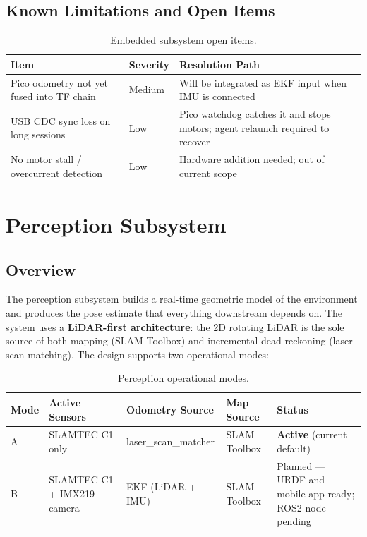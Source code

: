 \documentclass[12pt,a4paper]{report}
\begin{document}
\section{Known Limitations and Open Items}

\begin{table}[H]
\centering
\caption{Embedded subsystem open items.}
\label{tab:pico_limits}
\begin{tabularx}{\textwidth}{|p{3.8cm}|p{1.4cm}|X|}
\hline
\textbf{Item} & \textbf{Severity} & \textbf{Resolution Path} \\
\hline
Pico odometry not yet fused into TF chain & Medium & Will be integrated as EKF input when IMU is connected \\
\hline
USB CDC sync loss on long sessions & Low & Pico watchdog catches it and stops motors; agent relaunch required to recover \\
\hline
No motor stall / overcurrent detection & Low & Hardware addition needed; out of current scope \\
\hline
\end{tabularx}
\end{table}

\chapter{Perception Subsystem}

\section{Overview}

The perception subsystem builds a real-time geometric model of the environment and produces the pose estimate that everything downstream depends on. The system uses a \textbf{LiDAR-first architecture}: the 2D rotating LiDAR is the sole source of both mapping (SLAM Toolbox) and incremental dead-reckoning (laser scan matching). The design supports two operational modes:

\begin{table}[H]
\centering
\caption{Perception operational modes.}
\label{tab:perc_modes}
\begin{tabularx}{\textwidth}{|p{1.5cm}|p{2.8cm}|p{2.8cm}|p{2.2cm}|X|}
\hline
\textbf{Mode} & \textbf{Active Sensors} & \textbf{Odometry Source} & \textbf{Map Source} & \textbf{Status} \\
\hline
A & SLAMTEC C1 only & laser\_scan\_matcher & SLAM Toolbox & \textbf{Active} (current default) \\
\hline
B & SLAMTEC C1 + IMX219 camera & EKF (LiDAR + IMU) & SLAM Toolbox & Planned --- URDF and mobile app ready; ROS2 node pending \\
\hline
\end{tabularx}
\end{table}
\end{document}

